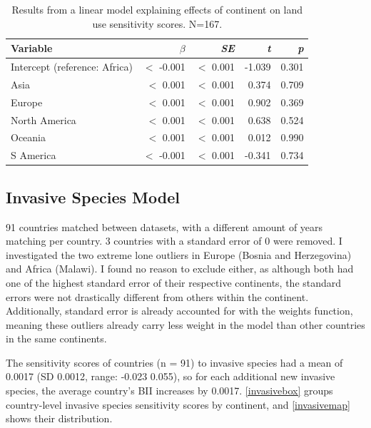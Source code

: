 \documentclass[11pt, a4paper, titlepage]{article}
\begin{document}
    \begin{table}[H]
    	\begin{center}
    		\caption{Results from a linear model explaining effects of continent on land use sensitivity scores. \textmd{N=167.}}
    		\label{tab:landuse}
    		\begin{tabular}{l|r|r|r|r} %
    			Variable & $\beta$ & \textit{SE} & \textit{t} & \textit{p}\\
    			\hline
    			Intercept (reference: Africa) & $<$ -0.001 & $<$ 0.001 & -1.039 & 0.301\\
    			Asia & $<$ 0.001 & $<$ 0.001 & 0.374 & 0.709\\
    			Europe & $<$ 0.001 & $<$ 0.001 & 0.902 & 0.369 \\
    			North America & $<$ 0.001 & $<$ 0.001 & 0.638 & 0.524\\
    			Oceania & $<$ 0.001 & $<$ 0.001 & 0.012 & 0.990\\
    			S America & $<$ -0.001 & $<$ 0.001 & -0.341 & 0.734\\
    		\end{tabular}
    	\end{center}
    \end{table}
    
    \newpage
	\subsection*{Invasive Species Model}

	
	91 countries matched between datasets, with a different amount of years matching per country. 3 countries with a standard error of 0 were removed. I investigated the two extreme lone outliers in Europe  (Bosnia and Herzegovina) and Africa (Malawi). I found no reason to exclude either, as although both had one of the highest standard error of their respective continents, the standard errors were not drastically different from others within the continent. Additionally, standard error is already accounted for with the weights function, meaning these outliers already carry less weight in the model than other countries in the same continents.
	
	The sensitivity scores of countries (n = 91) to invasive species had a mean of 0.0017 (SD 0.0012, range: -0.023  0.055), so for each additional new invasive species, the average country's BII increases by 0.0017. \autoref{invasivebox} groups country-level invasive species sensitivity scores by continent, and \autoref{invasivemap} shows their distribution. \newline
\end{document}
